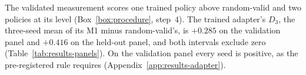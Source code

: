 The validated measurement scores one trained policy above random-valid and two policies at its level (Box~\ref{box:procedure}, step~4). The trained adapter's $D_3$, the three-seed mean of its M1 minus random-valid's, is $+0.285$ on the validation panel and $+0.416$ on the held-out panel, and both intervals exclude zero (Table~\ref{tab:results-panels}). On the validation panel every seed is positive, as the pre-registered rule requires (Appendix~\ref{app:results-adapter}).

